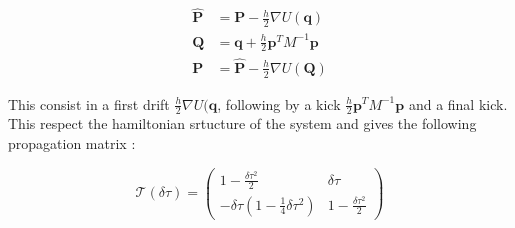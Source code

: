 \documentclass[ansiapaper]{report}
\begin{document}
\begin{multicols}{3}
	\begin{align}
		\hat{\textbf{P} } & = \textbf{P}  - \frac{h}{2} \nabla U(\textbf{q} )         \\
		\textbf{Q}        & = \textbf{q}  +  \frac{h}{2}\textbf{p} ^TM^{-1}\textbf{p} \\
		\textbf{P}        & = \hat{\textbf{P} } - \frac{h}{2} \nabla U(\textbf{Q} )
	\end{align}

	This consist in a first drift $\frac{h}{2} \nabla U(\textbf{q}$, following by a kick  $\frac{h}{2}\textbf{p} ^TM^{-1}\textbf{p}$ and a final kick. This respect the hamiltonian srtucture of the system and gives the following  propagation matrix :

	$$
		\mathcal{T}(\delta \tau) = \begin{pmatrix}
			1 - \frac{\delta \tau^2}{2}                             & \delta \tau                 \\
			-\delta \tau \left(1 - \frac{1}{4} \delta \tau^2\right) & 1 - \frac{\delta \tau^2}{2}
		\end{pmatrix}
	$$


\end{multicols}
\end{document}

